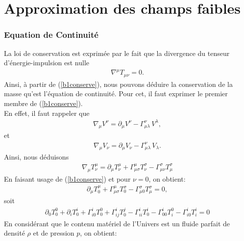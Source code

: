 \documentclass[a4paper,12pt]{report}
\theoremstyle{plain}
\theoremstyle{plain}
\begin{document}

\part{Approximation des champs faibles}
\minitoc
\section{Equation de Continuit\'e}
La loi de conservation est exprim\'ee par le fait que la divergence du tenseur
d'\'energie-impulsion est nulle
 \begin{eqnarray}\label{b1conserve}
 \nabla^{\mu} T_{\mu\nu}=0.
\end{eqnarray}
Ainsi, \`a partir de (\ref{b1conserve}), nous pouvons d\'eduire la conservation de la masse qu'est l'\'equation de
continuit\'e. Pour cet, il faut exprimer le premier membre de (\ref{b1conserve}). \\
En effet, il faut rappeler que 
\begin{eqnarray}
 \nabla_{\mu} V^\nu = \partial_\mu V^\nu -\Gamma^\nu_{\mu\lambda}\, V^\lambda,
\end{eqnarray}
et
\begin{eqnarray}
 \nabla_{\mu} V_\nu = \partial_\mu V_\nu -\Gamma^\nu_{\mu\lambda}\, V_\lambda.
\end{eqnarray}
Ainsi,  nous d\'eduisons
\begin{eqnarray}
 \nabla_{\mu} T^\mu_\nu = \partial_\mu T^\mu_\nu  + \Gamma^\mu_{\mu\sigma}
 T^\sigma_\nu -  \Gamma^\sigma_{\mu\nu} T^\sigma_\mu
\end{eqnarray}
En faisant usage de (\ref{b1conserve}) et  pour $\nu=0$, on obtient:
\begin{eqnarray}
  \partial_\mu T^\mu_0  + \Gamma^\mu_{\mu\sigma}
 T^\sigma_0 -  \Gamma^\sigma_{\mu0} T^\sigma_\mu=0,
\end{eqnarray}
soit 
\begin{eqnarray}
  \partial_0 T^0_0  +\partial_i T^i_0+ \Gamma^i_{i0}
 T^0_0 +   \Gamma^i_{ij} T^j_0- \Gamma^i_{ii} T^i_0-\Gamma^i_{00} T^0_i -\Gamma^i_{i0} T^i_i=0
\end{eqnarray}
En consid\'erant que le contenu mat\'eriel de l'Univers est un fluide parfait de densit\'e 
$\rho$ et de pression $p$, on obtient:
\end{document}
